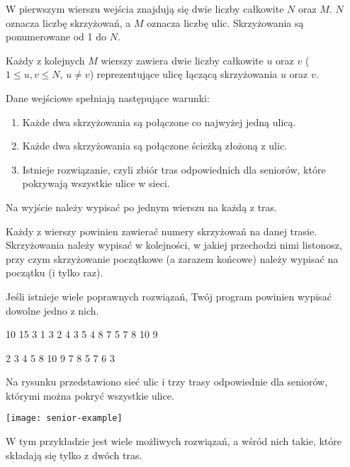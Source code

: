\documentclass{boi2014-pl}
\begin{document}
    W pierwszym wierszu wejścia znajdują się dwie liczby całkowite $N$ oraz $M$.
    $N$ oznacza liczbę skrzyżowań, a $M$ oznacza liczbę ulic.
    Skrzyżowania są ponumerowane od 1 do $N$.

    Każdy z kolejnych $M$ wierszy zawiera dwie liczby całkowite
    $u$ oraz $v$ ($1 \le u,v \le N$, $u \ne v$) reprezentujące ulicę łączącą
    skrzyżowania $u$ oraz $v$.

    Dane wejściowe spełniają następujące warunki:
    \begin{enumerate}
        \item Każde dwa skrzyżowania są połączone co najwyżej jedną ulicą.
        \item Każde dwa skrzyżowania są połączone ścieżką złożoną z ulic.
        \item Istnieje rozwiązanie, czyli zbiór tras odpowiednich dla seniorów,
          które pokrywają wszystkie ulice w sieci.
    \end{enumerate}

    \Output
    Na wyjście należy wypisać po jednym wierszu na każdą z tras.

    Każdy z wierszy powinien zawierać numery skrzyżowań na danej trasie.
    Skrzyżowania należy wypisać w kolejności, w jakiej przechodzi nimi listonosz,
    przy czym skrzyżowanie początkowe (a zarazem końcowe) należy wypisać na początku (i tylko raz).

    Jeśli istnieje wiele poprawnych rozwiązań, Twój program powinien wypisać dowolne jedno z nich.

    \Example

    \example
    {
        10 15  3  1 3  2 4  3 5  4 8  7  5 7  8  10  9
    }
    {
        2 3 4 5 8 10 9  7 8  5 7 6 3

    }
    {
        Na rysunku przedstawiono sieć ulic i trzy trasy odpowiednie dla seniorów,
        którymi można pokryć wszystkie ulice.

        \texttt{[image: senior-example]}

        W tym przykładzie jest wiele możliwych rozwiązań, a wśród nich takie, które
        składają się tylko z dwóch tras.
    
    }
\end{document}

